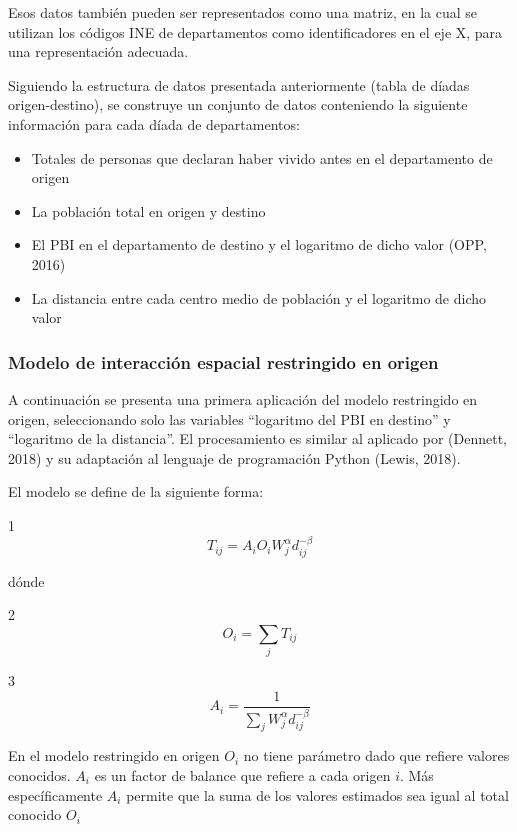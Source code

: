 \documentclass[12pt,spanish,]{article}
\providecommand{\tightlist}{%
  \setlength{\itemsep}{0pt}\setlength{\parskip}{0pt}}
\begin{document}
Esos datos también pueden ser representados como una matriz, en la cual
se utilizan los códigos INE de departamentos como identificadores en el
eje X, para una representación adecuada.

\newpage
\begin{landscape}

\end{landscape}

Siguiendo la estructura de datos presentada anteriormente (tabla de
díadas origen-destino), se construye un conjunto de datos conteniendo la
siguiente información para cada díada de departamentos:

\begin{itemize}
\tightlist
\item
  Totales de personas que declaran haber vivido antes en el departamento
  de origen
\item
  La población total en origen y destino
\item
  El PBI en el departamento de destino y el logaritmo de dicho valor
  (OPP, 2016)
\item
  La distancia entre cada centro medio de población y el logaritmo de
  dicho valor
\end{itemize}

\hypertarget{modelo-de-interacciuxf3n-espacial-restringido-en-origen}{%
\subsubsection{Modelo de interacción espacial restringido en
origen}\label{modelo-de-interacciuxf3n-espacial-restringido-en-origen}}

A continuación se presenta una primera aplicación del modelo restringido
en origen, seleccionando solo las variables ``logaritmo del PBI en
destino'' y ``logaritmo de la distancia''. El procesamiento es similar
al aplicado por (Dennett, 2018) y su adaptación al lenguaje de
programación Python (Lewis, 2018).

El modelo se define de la siguiente forma:

1 \[T_{ij} = A_{i}O_{i}W_{j}^{\alpha}d_{ij}^{-\beta}\]

dónde

2 \[O_{i} = \sum_{j}T_{ij}\]

3 \[A_{i} = \frac{1}{\sum_{j}W_{j}^{\alpha}d_{ij}^{-\beta}}\]

En el modelo restringido en origen \(O_{i}\) no tiene parámetro dado que
refiere valores conocidos. \(A_{i}\) es un factor de balance que refiere
a cada origen \(i\). Más específicamente \(A_{i}\) permite que la suma
de los valores estimados sea igual al total conocido \(O_{i}\)
\end{document}

